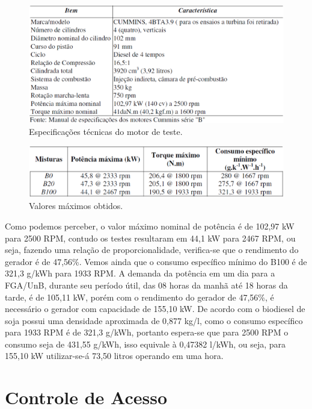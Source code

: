 \begin{figure}[!h]
  \centering
  \includegraphics[keepaspectratio=true,scale=0.5]{figuras/tabela_motor.eps}
  \caption{Especificações técnicas do motor de teste.}
  \label{fig:tabela_motor}
\end{figure}

\begin{figure}[!h]
  \centering
  \includegraphics[keepaspectratio=true,scale=0.5]{figuras/tabela_resultados.eps}
  \caption{Valores máximos obtidos.}
  \label{fig:tabela_resultados}
\end{figure}

Como podemos perceber, o valor máximo nominal de potência é de 102,97 kW para 2500 RPM, contudo os testes resultaram em 44,1 kW para 2467 RPM, ou seja, fazendo uma relação de proporcionalidade, verifica-se que o rendimento do gerador é de 47,56\%.
Vemos ainda que o consumo específico mínimo do B100 é de 321,3 g/kWh para 1933 RPM.
A demanda da potência em um dia para a FGA/UnB, durante seu período útil, das 08 horas da manhã até 18 horas da tarde, é de 105,11 kW, porém com o rendimento do gerador de 47,56\%, é necessário o gerador com capacidade de 155,10 kW.
De acordo com \cite{regina} o biodiesel de soja possui uma densidade aproximada de 0,877 kg/l, como o consumo específico para 1933 RPM é de 321,3 g/kWh, portanto espera-se que para 2500 RPM o consumo seja de 431,55 g/kWh, isso equivale à 0,47382 l/kWh, ou seja, para 155,10 kW utilizar-se-á 73,50 litros operando em uma hora.

\chapter[Controle de Acesso]{Controle de Acesso}
